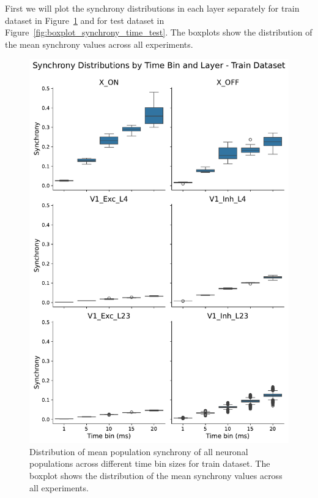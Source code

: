 First we will plot the synchrony distributions in each layer separately for train dataset in Figure~\ref{fig:boxplot_synchrony_time_train} and for test dataset in Figure~\ref{fig:boxplot_synchrony_time_test}. The boxplots show the distribution of the mean synchrony values across all experiments.


\begin{figure}
    \centering
    \includegraphics[width=0.92\linewidth]{img/plots/synchrony_boxplot_time_bins_train.pdf}
    \caption{Distribution of mean population synchrony of all neuronal populations across different time bin sizes for train dataset. The boxplot shows the distribution of the mean synchrony values across all experiments.}
    \label{fig:boxplot_synchrony_time_train}
\end{figure}



